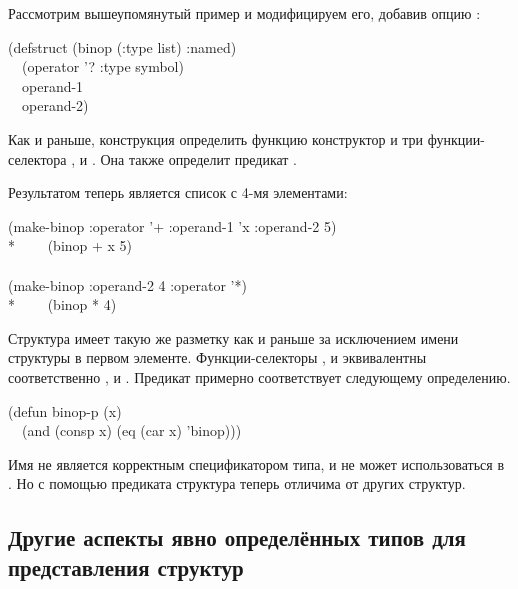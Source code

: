 Рассмотрим вышеупомянутый пример  и модифицируем его, добавив
опцию :
\begin{lisp}
(defstruct (binop (:type list) :named) \\
~~(operator '? :type symbol) \\
~~operand-1 \\
~~operand-2)
\end{lisp}
Как и раньше, конструкция определить функцию конструктор  и три
функции-селектора  ,  и
. Она также определит предикат .

Результатом  теперь является список с 4-мя элементами:
\begin{lisp}
(make-binop :operator '+ :operand-1 'x :operand-2 5) \\*
~~~\EV\ (binop + x 5) \\
\\
(make-binop :operand-2 4 :operator '*) \\*
~~~\EV\ (binop * {\nil} 4)
\end{lisp}
Структура имеет такую же разметку как и раньше за исключением имени структуры в
первом элементе.
Функции-селекторы
, и  эквивалентны
соответственно ,  и .
Предикат  примерно соответствует следующему определению.
\begin{lisp}
(defun binop-p (x) \\
~~(and (consp x) (eq (car x) 'binop)))
\end{lisp}
Имя  не является корректным спецификатором типа, и не может
использоваться в . Но с помощью предиката структура теперь отличима 
от других структур. 

\subsection{Другие аспекты явно определённых типов для представления структур}
\label{DEFSTRUCT-INITIAL-OFFSET}

